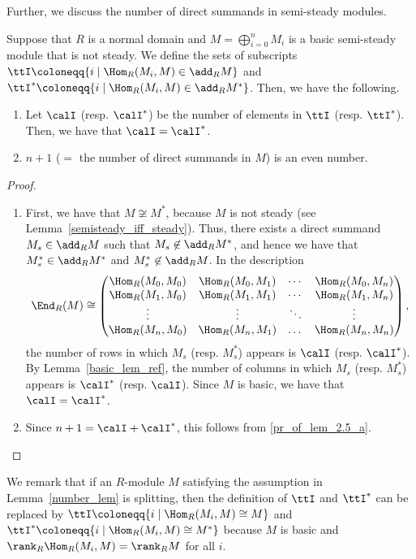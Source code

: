 Further, we discuss the number of direct summands in semi-steady modules.

\begin{lemm}\label{number_lem}
Suppose that $R$ is a normal domain and $M=\bigoplus_{i=0}^nM_i$ is a basic semi-steady module that is not steady. We define the sets of subscripts $\ttI\coloneqq\{i \mid \Hom_R(M_i,M)\in \add_RM\}$ and $\ttI^*\coloneqq\{i \mid \Hom_R(M_i,M)\in \add_RM^*\}$. Then, we have the following.
\begin{enumerate}%
\item\label{lem2-5_a} Let $\calI$ (resp. $\calI^*$) be the number of elements in $\ttI$ (resp. $\ttI^*$). Then, we have that $\calI=\calI^*$.
\item\label{lem2-5_b} $n+1$ ($=$ the number of direct summands in $M$) is an even number.
\end{enumerate}
\end{lemm}

\begin{proof}\ 

\begin{enumerate}%
\item\label{pr_of_lem_2.5_a}
First, we have that $M\not\cong M^*$, because $M$ is not steady (see Lemma~\ref{semisteady_iff_steady}). Thus, there exists a direct summand $M_s\in\add_RM$ such that $M_s\not\in\add_RM^*$, and hence we have that $M_s^*\in\add_RM^*$ and $M_s^*\not\in\add_RM$. In the description
\[
\End_R(M)\cong
\begin{pmatrix}
\Hom_R(M_0,M_0)&\Hom_R(M_0,M_1)&\cdots&\Hom_R(M_0,M_n) \\
\Hom_R(M_1,M_0)&\Hom_R(M_1,M_1)&\cdots&\Hom_R(M_1,M_n) \\
\vdots&\vdots&\ddots&\vdots \\
\Hom_R(M_n,M_0)&\Hom_R(M_n,M_1)&\dots&\Hom_R(M_n,M_n) \\
\end{pmatrix},
\]
the number of rows in which $M_s$ (resp. $M_s^*$) appears is $\calI$ (resp. $\calI^*$). By Lemma~\ref{basic_lem_ref}, the number of columns in which $M_s$ (resp. $M_s^*$) appears is $\calI^*$ (resp. $\calI$). Since $M$ is basic, we have that $\calI=\calI^*$.

\item\label{pr_of_lem_2.5_b}
Since $n+1=\calI+\calI^*$, this follows from \eqref{pr_of_lem_2.5_a}.\qedhere
\end{enumerate}
\end{proof}

We remark that if an $R$-module $M$ satisfying the assumption in Lemma~\ref{number_lem} is splitting, then the definition of $\ttI$ and $\ttI^*$ can be replaced by $\ttI\coloneqq\{i \mid \Hom_R(M_i,M)\cong M\}$ and $\ttI^*\coloneqq\{i \mid \Hom_R(M_i,M)\cong M^*\}$ because $M$ is basic and $\rank_R\Hom_R(M_i,M)=\rank_RM$ for all $i$.

